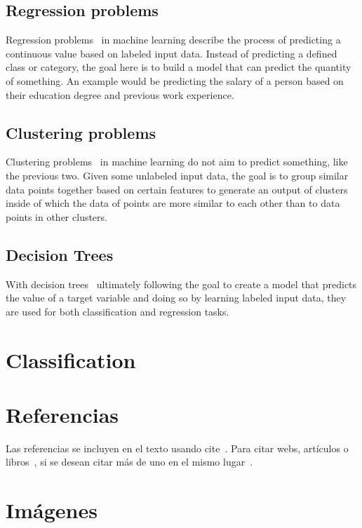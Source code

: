 \subsection{Regression problems}
Regression problems~\cite{classification_regression} in machine learning describe the process of predicting a continuous value based on labeled input data. Instead of predicting a defined class or category, the goal here is to build a model that can predict the quantity of something. An example would be predicting the salary of a person based on their education degree and previous work experience.

\subsection{Clustering problems}
Clustering problems~\cite{clustering} in machine learning do not aim to predict something, like the previous two. Given some unlabeled input data, the goal is to group similar data points together based on certain features to generate an output of clusters inside of which the data of points are more similar to each other than to data points in other clusters.

\subsection{Decision Trees}
With decision trees~\cite{decisiontrees} ultimately following the goal to create a model that predicts the value of a target variable and doing so by learning labeled input data, they are used for both classification and regression tasks.

\section{Classification} \label{classification}

\section{Referencias}

Las referencias se incluyen en el texto usando cite~\cite{wiki:latex}. Para citar webs, artículos o libros~\cite{koza92}, si se desean citar más de uno en el mismo lugar~\cite{bortolot2005, koza92}.


\section{Imágenes}


